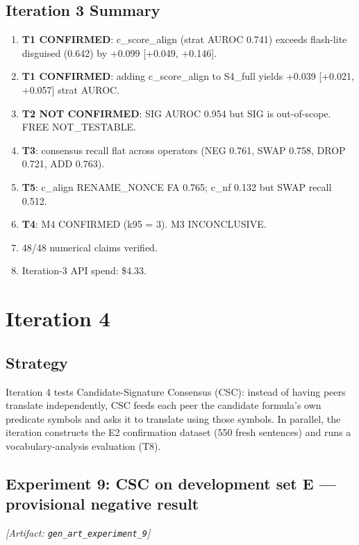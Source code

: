 \documentclass[11pt,letterpaper]{article}
\begin{document}
\subsection{Iteration 3 Summary}

\begin{enumerate}
\item \textbf{T1 CONFIRMED}: c\_score\_align (strat AUROC 0.741) exceeds flash-lite disguised (0.642) by +0.099 [+0.049, +0.146].
\item \textbf{T1 CONFIRMED}: adding c\_score\_align to S4\_full yields +0.039 [+0.021, +0.057] strat AUROC.
\item \textbf{T2 NOT CONFIRMED}: SIG AUROC 0.954 but SIG is out-of-scope.
  FREE NOT\allowbreak\_\allowbreak TESTABLE.
\item \textbf{T3}: consensus recall flat across operators
  (NEG 0.761, SWAP 0.758, DROP 0.721, ADD 0.763).
\item \textbf{T5}: c\_align RENAME\allowbreak\_\allowbreak NONCE FA 0.765;
  c\_nf 0.132 but SWAP recall 0.512.
\item \textbf{T4}: M4 CONFIRMED (k95 = 3). M3 INCONCLUSIVE.
\item 48/48 numerical claims verified.
\item Iteration-3 API spend: \$4.33.
\end{enumerate}

\section{Iteration 4}

\subsection{Strategy}

Iteration 4 tests Candidate-Signature Consensus (CSC): instead of having peers translate independently, CSC feeds each peer the candidate formula's own predicate symbols and asks it to translate using those symbols. In parallel, the iteration constructs the E2 confirmation dataset (550 fresh sentences) and runs a vocabulary-analysis evaluation (T8).

\subsection{Experiment 9: CSC on development set E --- provisional negative result}
\label{sec:exp9}
\noindent\textit{[Artifact: \texttt{gen\_art\_experiment\_9}]}
\end{document}
